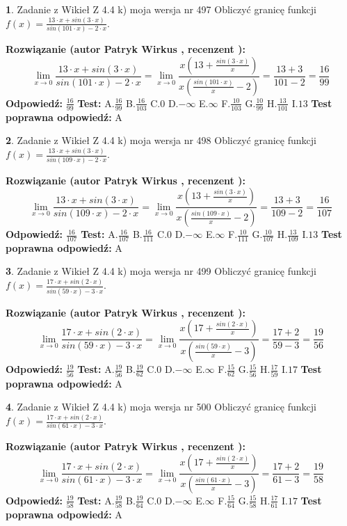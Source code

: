 \documentclass[12pt, a4paper]{article}
\theoremstyle{definition} %
\newtheorem{zad}{}
\newcommand{\zadStart}[1]{\begin{zad}#1\newline}
\newcommand{\zadStop}{\end{zad}}
\newcommand{\rozwStart}[2]{\noindent \textbf{Rozwiązanie (autor #1 , recenzent #2): }\newline}
\newcommand{\rozwStop}{\newline}
\newcommand{\odpStart}{\noindent \textbf{Odpowiedź:}\newline}
\newcommand{\odpStop}{\newline}
\newcommand{\testStart}{\noindent \textbf{Test:}\newline}
\newcommand{\testStop}{\newline}
\newcommand{\kluczStart}{\noindent \textbf{Test poprawna odpowiedź:}\newline}
\newcommand{\kluczStop}{\newline}
\begin{document}
\zadStart{Zadanie z Wikieł Z 4.4 k) moja wersja nr 497}
Obliczyć granicę funkcji $f(x)=\frac{13\cdot x +sin(3\cdot x)}{sin(101\cdot x) -2\cdot x}$.
\zadStop
\rozwStart{Patryk Wirkus}{}
$$\lim\limits_{x\to 0}\frac{13\cdot x +sin(3\cdot x)}{sin(101\cdot x) -2\cdot x}
=\lim\limits_{x\to 0}\frac{x(13+\frac{sin(3\cdot x)}{x})}{x(\frac{sin(101\cdot x)}{x}-2)}
=\frac{13+3}{101-2} = \frac{16}{99}$$
\rozwStop
\odpStart
$\frac{16}{99}$
\odpStop
\testStart
A.$\frac{16}{99}$
B.$\frac{16}{103}$
C.$0$
D.$-\infty$
E.$\infty$
F.$\frac{10}{103}$
G.$\frac{10}{99}$
H.$\frac{13}{101}$
I.$13$
\testStop
\kluczStart
A
\kluczStop



\zadStart{Zadanie z Wikieł Z 4.4 k) moja wersja nr 498}
Obliczyć granicę funkcji $f(x)=\frac{13\cdot x +sin(3\cdot x)}{sin(109\cdot x) -2\cdot x}$.
\zadStop
\rozwStart{Patryk Wirkus}{}
$$\lim\limits_{x\to 0}\frac{13\cdot x +sin(3\cdot x)}{sin(109\cdot x) -2\cdot x}
=\lim\limits_{x\to 0}\frac{x(13+\frac{sin(3\cdot x)}{x})}{x(\frac{sin(109\cdot x)}{x}-2)}
=\frac{13+3}{109-2} = \frac{16}{107}$$
\rozwStop
\odpStart
$\frac{16}{107}$
\odpStop
\testStart
A.$\frac{16}{107}$
B.$\frac{16}{111}$
C.$0$
D.$-\infty$
E.$\infty$
F.$\frac{10}{111}$
G.$\frac{10}{107}$
H.$\frac{13}{109}$
I.$13$
\testStop
\kluczStart
A
\kluczStop



\zadStart{Zadanie z Wikieł Z 4.4 k) moja wersja nr 499}
Obliczyć granicę funkcji $f(x)=\frac{17\cdot x +sin(2\cdot x)}{sin(59\cdot x) -3\cdot x}$.
\zadStop
\rozwStart{Patryk Wirkus}{}
$$\lim\limits_{x\to 0}\frac{17\cdot x +sin(2\cdot x)}{sin(59\cdot x) -3\cdot x}
=\lim\limits_{x\to 0}\frac{x(17+\frac{sin(2\cdot x)}{x})}{x(\frac{sin(59\cdot x)}{x}-3)}
=\frac{17+2}{59-3} = \frac{19}{56}$$
\rozwStop
\odpStart
$\frac{19}{56}$
\odpStop
\testStart
A.$\frac{19}{56}$
B.$\frac{19}{62}$
C.$0$
D.$-\infty$
E.$\infty$
F.$\frac{15}{62}$
G.$\frac{15}{56}$
H.$\frac{17}{59}$
I.$17$
\testStop
\kluczStart
A
\kluczStop



\zadStart{Zadanie z Wikieł Z 4.4 k) moja wersja nr 500}
Obliczyć granicę funkcji $f(x)=\frac{17\cdot x +sin(2\cdot x)}{sin(61\cdot x) -3\cdot x}$.
\zadStop
\rozwStart{Patryk Wirkus}{}
$$\lim\limits_{x\to 0}\frac{17\cdot x +sin(2\cdot x)}{sin(61\cdot x) -3\cdot x}
=\lim\limits_{x\to 0}\frac{x(17+\frac{sin(2\cdot x)}{x})}{x(\frac{sin(61\cdot x)}{x}-3)}
=\frac{17+2}{61-3} = \frac{19}{58}$$
\rozwStop
\odpStart
$\frac{19}{58}$
\odpStop
\testStart
A.$\frac{19}{58}$
B.$\frac{19}{64}$
C.$0$
D.$-\infty$
E.$\infty$
F.$\frac{15}{64}$
G.$\frac{15}{58}$
H.$\frac{17}{61}$
I.$17$
\testStop
\kluczStart
A
\kluczStop
\end{document}
